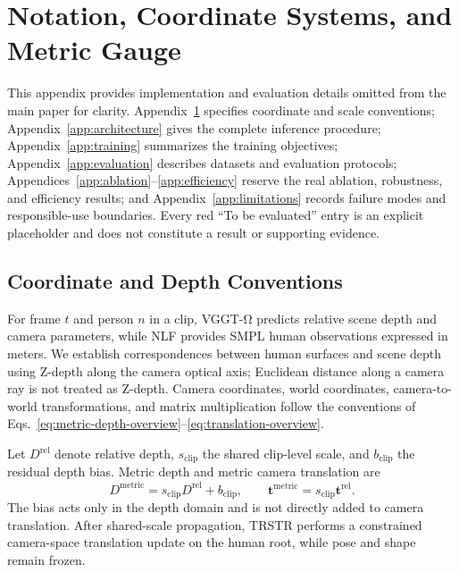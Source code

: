 \section{Notation, Coordinate Systems, and Metric Gauge}
\label{app:coordinates}

This appendix provides implementation and evaluation details omitted from the main paper for clarity. Appendix~\ref{app:coordinates} specifies coordinate and scale conventions; Appendix~\ref{app:architecture} gives the complete inference procedure; Appendix~\ref{app:training} summarizes the training objectives; Appendix~\ref{app:evaluation} describes datasets and evaluation protocols; Appendices~\ref{app:ablation}--\ref{app:efficiency} reserve the real ablation, robustness, and efficiency results; and Appendix~\ref{app:limitations} records failure modes and responsible-use boundaries. Every red ``To be evaluated'' entry is an explicit placeholder and does not constitute a result or supporting evidence.

\subsection{Coordinate and Depth Conventions}

For frame $t$ and person $n$ in a clip, VGGT-Ω predicts relative scene depth and camera parameters, while NLF provides SMPL human observations expressed in meters. We establish correspondences between human surfaces and scene depth using Z-depth along the camera optical axis; Euclidean distance along a camera ray is not treated as Z-depth. Camera coordinates, world coordinates, camera-to-world transformations, and matrix multiplication follow the conventions of Eqs.~\ref{eq:metric-depth-overview}--\ref{eq:translation-overview}.

Let $D^{\mathrm{rel}}$ denote relative depth, $s_{\mathrm{clip}}$ the shared clip-level scale, and $b_{\mathrm{clip}}$ the residual depth bias. Metric depth and metric camera translation are
\begin{equation}
D^{\mathrm{metric}} = s_{\mathrm{clip}}D^{\mathrm{rel}} + b_{\mathrm{clip}},
\qquad
\mathbf{t}^{\mathrm{metric}} = s_{\mathrm{clip}}\mathbf{t}^{\mathrm{rel}}.
\label{eq:appendix-metric-propagation}
\end{equation}
The bias acts only in the depth domain and is not directly added to camera translation. After shared-scale propagation, TRSTR performs a constrained camera-space translation update on the human root, while pose and shape remain frozen.

